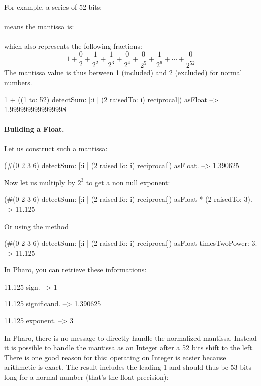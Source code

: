 \documentclass[a4paper,10pt,twoside]{book}
\begin{document}
For example, a series of 52 bits:\\
\\
 means the mantissa is:\\
 \\
 which also represents the following fractions:  \[ 1 + \frac{0}{2} +  \frac{1}{2^2} +  \frac{1}{2^3} +  \frac{0}{2^4} +  \frac{0}{2^5} +  \frac{1}{2^6} + \cdots  +  \frac{0}{2^{52}} \]
The mantissa value is thus between 1 (included) and 2 (excluded) for normal numbers.

\begin{code}{}
1 + ((1 to: 52) detectSum: [:i | (2 raisedTo: i) reciprocal]) asFloat 
	--> 1.9999999999999998
\end{code}




\paragraph{Building a Float.}
Let us construct such a mantissa:
\begin{code}{}
(#(0 2 3 6) detectSum: [:i | (2 raisedTo: i) reciprocal]) asFloat.
	--> 1.390625
\end{code}

Now let us multiply by $2^3$ to get a non null exponent:

\begin{code}{}
(#(0 2 3 6) detectSum: [:i | (2 raisedTo: i) reciprocal]) asFloat * (2 raisedTo: 3). 
	--> 11.125
\end{code}

Or using the method 

\begin{code}{}
(#(0 2 3 6) detectSum: [:i | (2 raisedTo: i) reciprocal]) asFloat timesTwoPower: 3.
	--> 11.125
\end{code}

In Pharo, you can retrieve these informations:
 \begin{code}{}
11.125 sign.
	--> 1
	
11.125 significand.
	--> 1.390625
	
11.125 exponent.
	--> 3
\end{code}



In Pharo, there is no message to directly handle the normalized mantissa. Instead it is possible to handle the mantissa as an Integer after a 52 bits shift to the left. There is one good reason for this: operating on Integer is easier because arithmetic is exact. The result includes the leading 1 and should thus be 53 bits long for a normal number (that's the float precision):
\end{document}
